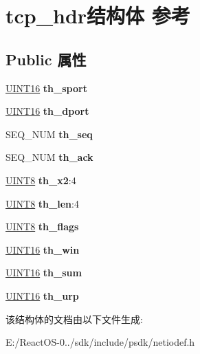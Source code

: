 \hypertarget{structtcp__hdr}{}\section{tcp\+\_\+hdr结构体 参考}
\label{structtcp__hdr}
\subsection*{Public 属性}
\begin{DoxyCompactItemize}
\item 
\mbox{\label{structtcp__hdr_a293b946624c5aa082f6c710028d38b5d}} 
\hyperlink{_processor_bind_8h_a09f1a1fb2293e33483cc8d44aefb1eb1}{U\+I\+N\+T16} {\bfseries th\+\_\+sport}
\item 
\mbox{\label{structtcp__hdr_a1088cd3d2bbf90443cf6c7efb2cfb7b7}} 
\hyperlink{_processor_bind_8h_a09f1a1fb2293e33483cc8d44aefb1eb1}{U\+I\+N\+T16} {\bfseries th\+\_\+dport}
\item 
\mbox{\label{structtcp__hdr_ab5dc3ca75d5f8563f922df98d7149086}} 
S\+E\+Q\+\_\+\+N\+UM {\bfseries th\+\_\+seq}
\item 
\mbox{\label{structtcp__hdr_a1d3afb2dbf42d2644766b2b22525c24f}} 
S\+E\+Q\+\_\+\+N\+UM {\bfseries th\+\_\+ack}
\item 
\mbox{\label{structtcp__hdr_ae7c25ed35d6f49e8b00fc39b57b06d54}} 
\hyperlink{_processor_bind_8h_ab27e9918b538ce9d8ca692479b375b6a}{U\+I\+N\+T8} {\bfseries th\+\_\+x2}\+:4
\item 
\mbox{\label{structtcp__hdr_a1d64c2777eb686f07d51a8e2ab89a7b5}} 
\hyperlink{_processor_bind_8h_ab27e9918b538ce9d8ca692479b375b6a}{U\+I\+N\+T8} {\bfseries th\+\_\+len}\+:4
\item 
\mbox{\label{structtcp__hdr_a9d50ce79786da371d92472365fae490c}} 
\hyperlink{_processor_bind_8h_ab27e9918b538ce9d8ca692479b375b6a}{U\+I\+N\+T8} {\bfseries th\+\_\+flags}
\item 
\mbox{\label{structtcp__hdr_a995d62839317bc53f394cd84ea267d67}} 
\hyperlink{_processor_bind_8h_a09f1a1fb2293e33483cc8d44aefb1eb1}{U\+I\+N\+T16} {\bfseries th\+\_\+win}
\item 
\mbox{\label{structtcp__hdr_aa03aac5c2f60cfc0ffb5c7ea7d278f26}} 
\hyperlink{_processor_bind_8h_a09f1a1fb2293e33483cc8d44aefb1eb1}{U\+I\+N\+T16} {\bfseries th\+\_\+sum}
\item 
\mbox{\label{structtcp__hdr_a4330fba50bcf5516e4b38920a95869ed}} 
\hyperlink{_processor_bind_8h_a09f1a1fb2293e33483cc8d44aefb1eb1}{U\+I\+N\+T16} {\bfseries th\+\_\+urp}
\end{DoxyCompactItemize}


该结构体的文档由以下文件生成\+:\begin{DoxyCompactItemize}
\item 
E\+:/\+React\+O\+S-\/0../sdk/include/psdk/netiodef.\+h\end{DoxyCompactItemize}
